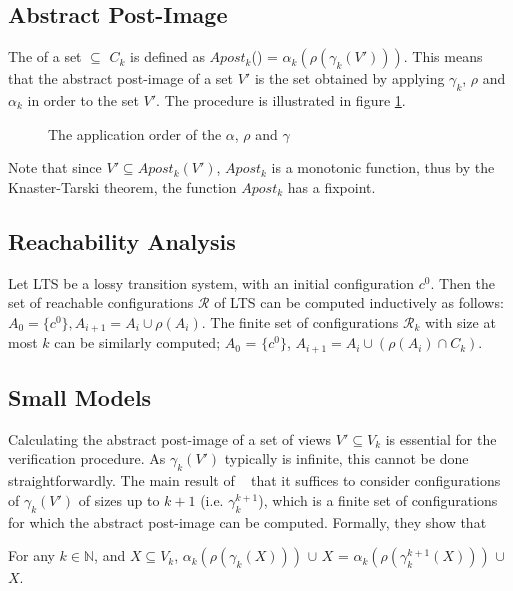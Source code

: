 \subsection{Abstract Post-Image}
The  of a set  $\subseteq$ $C_k$ is defined as $Apost_k$() = $\alpha_k(\rho(\gamma_k(V')))$. This means that the abstract post-image of a set $V'$ is the set obtained by applying $\gamma_k$, $\rho$ and $\alpha_k$ in order to the set $V'$. The procedure is illustrated in figure \ref{apost}.
\begin{figure}
\abstraction
\caption{The application order of the $\alpha$, $\rho$ and $\gamma$}
\label{apost}
\end{figure}

Note that since $V' \subseteq Apost_k(V')$, $Apost_k$ is a monotonic function, thus by the Knaster-Tarski theorem, the function $Apost_k$ has a fixpoint.

\subsection{Reachability Analysis}
\label{reachcompute}
Let LTS be a lossy transition system, with an initial configuration $c^0$. Then the set of reachable configurations $\mathcal{R}$ of LTS can be computed inductively as follows: $A_0 = \{c^0\}, A_{i+1}= A_i \cup \rho(A_i)$. The finite set of configurations $\mathcal{R}_k$ with size at most $k$ can be similarly computed; $A_0$ = $\{c^0\}$, $A_{i+1} = A_i \cup (\rho(A_i) \cap C_k)$.

\subsection{Small Models}
\label{proof}
Calculating the abstract post-image of a set of views $V' \subseteq V_k$ is essential for the verification procedure. As $\gamma_k(V')$ typically is infinite, this cannot be done straightforwardly. The main result of ~\cite{parosh} that it suffices to consider configurations of $\gamma_k(V')$ of sizes up to $k+1$ (i.e. $\gamma_k^{k+1}$), which is a finite set of configurations for which the abstract post-image can be computed. Formally, they show that

\begin{lemma}
\label{lemma1}
For any $k\in\mathbb{N}$, and $X\subseteq V_k$, $\alpha_k(\rho(\gamma_k(X)))$ $\cup$ $X$ = $\alpha_k(\rho(\gamma_k^{k+1}(X)))$ $\cup$ $X$.
\end{lemma}


